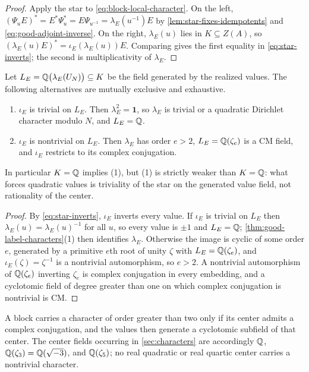 \begin{proof}
Apply the star to \eqref{eq:block-local-character}.  On the left,
\((\Psi_uE)^*=E^*\Psi_u^*=E\Psi_{u^{-1}}=\lambda_E(u^{-1})E\) by
\cref{lem:star-fixes-idempotents} and \eqref{eq:good-adjoint-inverse}.  On
the right, \(\lambda_E(u)\) lies in \(K\subseteq Z(A)\), so
\((\lambda_E(u)E)^*=\iota_E(\lambda_E(u))E\).  Comparing gives the first
equality in \eqref{eq:star-inverts}; the second is multiplicativity of
\(\lambda_E\).
\end{proof}

\begin{corollary}
\label{cor:quadratic-sharp}
Let \(L_E=\mathbb Q\bigl(\lambda_E(U_N)\bigr)\subseteq K\) be the field generated by
the realized values.  The following alternatives are mutually exclusive
and exhaustive.
\begin{enumerate}
\item \(\iota_E\) is trivial on \(L_E\).  Then \(\lambda_E^2=\mathbf1\), so
\(\lambda_E\) is trivial or a quadratic Dirichlet character modulo \(N\),
and \(L_E=\mathbb Q\).
\item \(\iota_E\) is nontrivial on \(L_E\).  Then \(\lambda_E\) has order
\(e>2\), \(L_E=\mathbb Q(\zeta_e)\) is a CM field, and \(\iota_E\) restricts to its
complex conjugation.
\end{enumerate}
In particular \(K=\mathbb Q\) implies (1), but (1) is strictly weaker than
\(K=\mathbb Q\): what forces quadratic values is triviality of the star on the
generated value field, not rationality of the center.
\end{corollary}

\begin{proof}
By \eqref{eq:star-inverts}, \(\iota_E\) inverts every value.  If \(\iota_E\)
is trivial on \(L_E\) then \(\lambda_E(u)=\lambda_E(u)^{-1}\) for all \(u\),
so every value is \(\pm1\) and \(L_E=\mathbb Q\); \cref{thm:good-label-characters}(1)
then identifies \(\lambda_E\).  Otherwise the image is cyclic of some order
\(e\), generated by a primitive \(e\)th root of unity \(\zeta\) with
\(L_E=\mathbb Q(\zeta_e)\), and \(\iota_E(\zeta)=\zeta^{-1}\) is a nontrivial
automorphism, so \(e>2\).  A nontrivial automorphism of \(\mathbb Q(\zeta_e)\)
inverting \(\zeta_e\) is complex conjugation in every embedding, and a
cyclotomic field of degree greater than one on which complex conjugation is
nontrivial is CM.
\end{proof}

A block carries a character of order greater than two only if its center
admits a complex conjugation, and the values then generate a cyclotomic
subfield of that center.  The center fields occurring in
\cref{sec:characters} are accordingly \(\mathbb Q\), \(\mathbb Q(\zeta_3)=\mathbb Q(\sqrt{-3})\),
and \(\mathbb Q(\zeta_5)\); no real quadratic or real quartic center carries a
nontrivial character.

